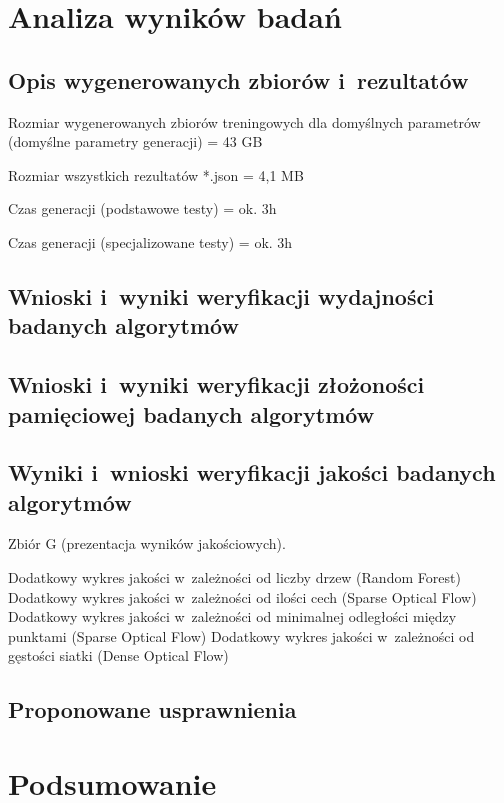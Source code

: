 \chapter{Analiza wyników badań}\label{Chapter_AnalizaRezultatow}

  \section{Opis wygenerowanych zbiorów i~rezultatów}\label{Section_Results}
  Rozmiar wygenerowanych zbiorów treningowych dla domyślnych parametrów (domyślne parametry generacji) = 43 GB

  Rozmiar wszystkich rezultatów *.json = 4,1 MB

  Czas generacji (podstawowe testy) = ok. 3h

  Czas generacji (specjalizowane testy) = ok. 3h

  \section{Wnioski i~wyniki weryfikacji wydajności badanych algorytmów}\label{Section_TimingAndOverhead}

  \section{Wnioski i~wyniki weryfikacji złożoności pamięciowej badanych algorytmów}\label{Section_Memory}

  \section{Wyniki i~wnioski weryfikacji jakości badanych algorytmów}\label{Section_Quality}

  Zbiór G (prezentacja wyników jakościowych).

  Dodatkowy wykres jakości w~zależności od liczby drzew (Random Forest)
  Dodatkowy wykres jakości w~zależności od ilości cech (Sparse Optical Flow)
  Dodatkowy wykres jakości w~zależności od minimalnej odległości między punktami (Sparse Optical Flow)
  Dodatkowy wykres jakości w~zależności od gęstości siatki (Dense Optical Flow)

  \section{Proponowane usprawnienia}\label{Section_Usprawnienia}

\chapter{Podsumowanie}\label{Section_Podsumowanie}